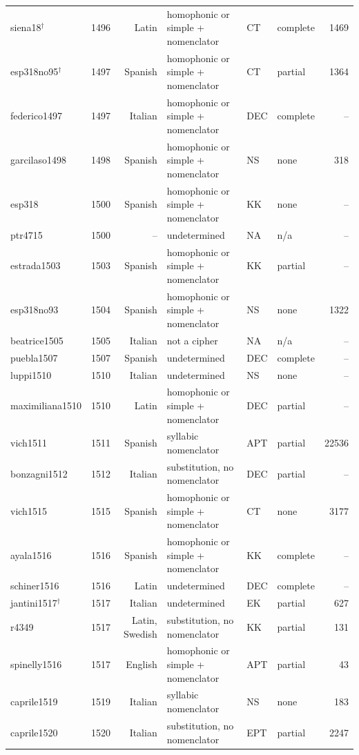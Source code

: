 {\begin{longtable}{@{}llrlllr@{}}
siena18$^\dagger$ & 1496 & Latin & homophonic or simple + nomenclator & CT & complete & 1469 \\
esp318no95$^\dagger$ & 1497 & Spanish & homophonic or simple + nomenclator & CT & partial & 1364 \\
federico1497 & 1497 & Italian & homophonic or simple + nomenclator & DEC & complete & -- \\
garcilaso1498 & 1498 & Spanish & homophonic or simple + nomenclator & NS & none & 318 \\
esp318 & 1500 & Spanish & homophonic or simple + nomenclator & KK & none & -- \\
ptr4715 & 1500 & -- & undetermined & NA & n/a & -- \\
estrada1503 & 1503 & Spanish & homophonic or simple + nomenclator & KK & partial & -- \\
esp318no93 & 1504 & Spanish & homophonic or simple + nomenclator & NS & none & 1322 \\
beatrice1505 & 1505 & Italian & not a cipher & NA & n/a & -- \\
puebla1507 & 1507 & Spanish & undetermined & DEC & complete & -- \\
luppi1510 & 1510 & Italian & undetermined & NS & none & -- \\
maximiliana1510 & 1510 & Latin & homophonic or simple + nomenclator & DEC & partial & -- \\
vich1511 & 1511 & Spanish & syllabic nomenclator & APT & partial & 22536 \\
bonzagni1512 & 1512 & Italian & substitution, no nomenclator & DEC & partial & -- \\
vich1515 & 1515 & Spanish & homophonic or simple + nomenclator & CT & none & 3177 \\
ayala1516 & 1516 & Spanish & homophonic or simple + nomenclator & KK & complete & -- \\
schiner1516 & 1516 & Latin & undetermined & DEC & complete & -- \\
jantini1517$^\dagger$ & 1517 & Italian & undetermined & EK & partial & 627 \\
r4349 & 1517 & Latin, Swedish & substitution, no nomenclator & KK & partial & 131 \\
spinelly1516 & 1517 & English & homophonic or simple + nomenclator & APT & partial & 43 \\
caprile1519 & 1519 & Italian & syllabic nomenclator & NS & none & 183 \\
caprile1520 & 1520 & Italian & substitution, no nomenclator & EPT & partial & 2247 \\

\end{longtable}}
